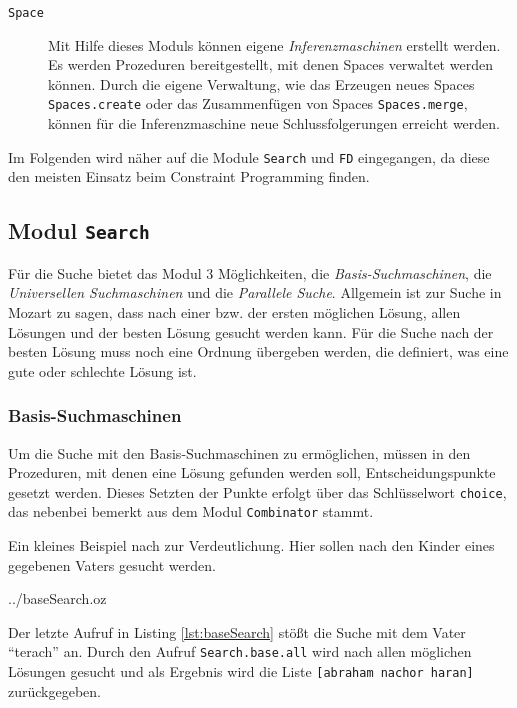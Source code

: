 \begin{description}
  \item[\texttt{Space}] Mit Hilfe dieses Moduls können eigene \textsl{Inferenzmaschinen}
  erstellt werden. Es werden Prozeduren bereitgestellt, mit denen Spaces
  verwaltet werden können. Durch die eigene Verwaltung, wie das Erzeugen neues
  Spaces \texttt{Spaces.create} oder das Zusammenfügen von Spaces
  \texttt{Spaces.merge}, können für die Inferenzmaschine neue Schlussfolgerungen
  erreicht werden. 
\end{description}

Im Folgenden wird näher auf die Module \texttt{Search} und \texttt{FD} 
eingegangen, da diese den meisten Einsatz beim Constraint Programming finden.

\subsection{Modul \texttt{Search}}
\label{subsection:Search}

Für die Suche bietet das Modul 3 Möglichkeiten, die
\textsl{Basis-Suchmaschinen}, die \textsl{Universellen Suchmaschinen} und die
\textsl{Parallele Suche}. Allgemein ist zur Suche in Mozart zu sagen, dass nach
einer bzw. der ersten möglichen Lösung, allen Lösungen und der besten Lösung
gesucht werden kann. Für die Suche nach der besten Lösung muss noch eine Ordnung
übergeben werden, die definiert, was eine gute oder schlechte Lösung ist.

\subsubsection{Basis-Suchmaschinen}

Um die Suche mit den Basis-Suchmaschinen zu ermöglichen, müssen in den
Prozeduren, mit denen eine Lösung gefunden werden soll, Entscheidungspunkte 
gesetzt werden. Dieses Setzten der Punkte erfolgt über das Schlüsselwort
\texttt{choice}, das nebenbei bemerkt aus dem Modul \texttt{Combinator} stammt. 

Ein kleines Beispiel nach \cite{LogicProgr:2003} zur Verdeutlichung. Hier sollen
nach den Kinder eines gegebenen Vaters gesucht werden.


	{../baseSearch.oz} 

Der letzte Aufruf in Listing \ref{lst:baseSearch} stößt die Suche mit dem Vater
"`terach"' an. Durch den Aufruf \texttt{Search.base.all} wird nach allen
möglichen Lösungen gesucht und als Ergebnis wird die Liste \texttt{[abraham
nachor haran]} zurückgegeben.

